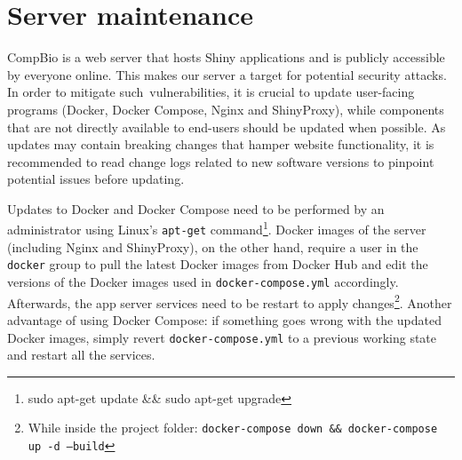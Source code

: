 \section{Server maintenance}


CompBio is a web server that hosts Shiny applications and is publicly accessible by everyone online. This makes our server a target for potential security attacks. In order to mitigate such vulnerabilities, it is crucial to update user-facing programs (Docker, Docker Compose, Nginx and ShinyProxy), while components that are not directly available to end-users should be updated when possible. As updates may contain breaking changes that hamper website functionality, it is recommended to read change logs related to new software versions to pinpoint potential issues before updating.


Updates to Docker and Docker Compose need to be performed by an administrator using Linux's \texttt{apt-get} command\footnote{sudo apt-get update \&\& sudo apt-get upgrade}. Docker images of the server (including Nginx and ShinyProxy), on the other hand, require a user in the \texttt{docker} group to pull the latest Docker images from Docker Hub and edit the versions of the Docker images used in \texttt{docker-compose.yml} accordingly. Afterwards, the app server services need to be restart to apply changes\footnote{While inside the project folder: \texttt{docker-compose down \&\& docker-compose up -d --build}}. Another advantage of using Docker Compose: if something goes wrong with the updated Docker images, simply revert \texttt{docker-compose.yml} to a previous working state and restart all the services.

